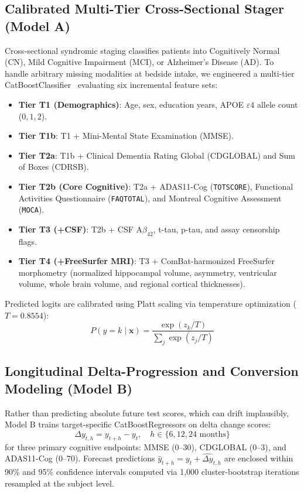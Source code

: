 \documentclass[11pt,a4paper]{article}
\begin{document}
\subsection{Calibrated Multi-Tier Cross-Sectional Stager (Model A)}
Cross-sectional syndromic staging classifies patients into Cognitively Normal (CN), Mild Cognitive Impairment (MCI), or Alzheimer's Disease (AD). To handle arbitrary missing modalities at bedside intake, we engineered a multi-tier CatBoostClassifier~\cite{prokhorenkova2018catboost} evaluating six incremental feature sets:
\begin{itemize}
    \item \textbf{Tier T1 (Demographics)}: Age, sex, education years, APOE $\varepsilon4$ allele count ($0, 1, 2$).
    \item \textbf{Tier T1b}: T1 + Mini-Mental State Examination (MMSE).
    \item \textbf{Tier T2a}: T1b + Clinical Dementia Rating Global (CDGLOBAL) and Sum of Boxes (CDRSB).
    \item \textbf{Tier T2b (Core Cognitive)}: T2a + ADAS11-Cog (\texttt{TOTSCORE}), Functional Activities Questionnaire (\texttt{FAQTOTAL}), and Montreal Cognitive Assessment (\texttt{MOCA}).
    \item \textbf{Tier T3 (+CSF)}: T2b + CSF $\text{A}\beta_{42}$, t-tau, p-tau, and assay censorship flags.
    \item \textbf{Tier T4 (+FreeSurfer MRI)}: T3 + ComBat-harmonized FreeSurfer morphometry (normalized hippocampal volume, asymmetry, ventricular volume, whole brain volume, and regional cortical thicknesses).
\end{itemize}
Predicted logits are calibrated using Platt scaling via temperature optimization ($T = 0.8554$):
\begin{equation}
    P(y = k \mid \mathbf{x}) = \frac{\exp(z_k / T)}{\sum_{j} \exp(z_j / T)}
\end{equation}

\subsection{Longitudinal Delta-Progression and Conversion Modeling (Model B)}
Rather than predicting absolute future test scores, which can drift implausibly, Model B trains target-specific CatBoostRegressors on delta change scores:
\begin{equation}
    \Delta y_{t, h} = y_{t+h} - y_t, \quad h \in \{6, 12, 24\text{ months}\}
\end{equation}
for three primary cognitive endpoints: MMSE ($0$--$30$), CDGLOBAL ($0$--$3$), and ADAS11-Cog ($0$--$70$). Forecast predictions $\hat{y}_{t+h} = y_t + \widehat{\Delta y}_{t, h}$ are enclosed within 90\% and 95\% confidence intervals computed via 1,000 cluster-bootstrap iterations resampled at the subject level.
\end{document}
